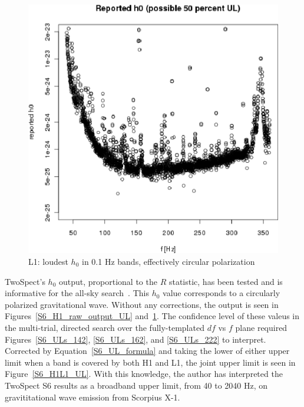 \begin{figure}
\begin{center}
\includegraphics[width=0.68\paperwidth,height=0.48\paperheight]{plots/h0FullUL50log-L1.eps}
\caption{
L1: loudest $h_0$ in 0.1 Hz bands, effectively circular polarization}
\label{S6_L1_raw_output_UL}
\end{center}
\end{figure}

TwoSpect's $h_0$ output, proportional to the $R$ statistic, has been tested and is informative for the all-sky search~\cite{GoetzTwoSpectMethods2011,GoetzTwoSpectResults2014}.
This $h_0$ value corresponds to a circularly polarized gravitational wave.
Without any corrections, the output is seen in Figures~\ref{S6_H1_raw_output_UL} and~\ref{S6_L1_raw_output_UL}.
The confidence level of these valeus in the multi-trial, directed search over the fully-templated $df$ vs $f$ plane required Figures~\ref{S6_ULs_142}, \ref{S6_ULs_162}, and \ref{S6_ULs_222} to interpret. 
Corrected by Equation~\ref{S6_UL_formula} and taking the lower of either upper limit when a band is covered by both H1 and L1, the joint upper limit is seen in Figure~\ref{S6_H1L1_UL}.
With this knowledge, the author has interpreted the TwoSpect S6 results as a broadband upper limit, from 40 to 2040 Hz, on gravititational wave emission from Scorpius X-1.
